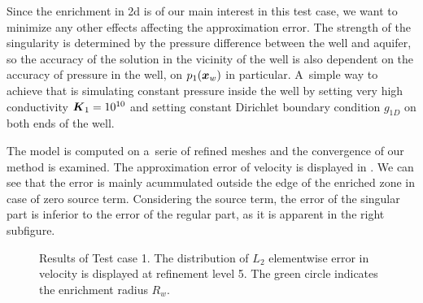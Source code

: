 Since the enrichment in 2d is of our main interest in this test case, we want to minimize any other effects
affecting the approximation error. The strength of the singularity is determined by the pressure difference
between the well and aquifer, so the accuracy of the solution in the vicinity of the well is also dependent
on the accuracy of pressure in the well, on $p_1(\mathbf{\boldsymbol{x}}_w)$ in particular.
A~simple way to achieve that is simulating constant pressure inside the well by setting very high conductivity $\mathbf{\boldsymbol{K}}_1=10^{10}$
and setting constant Dirichlet boundary condition $g_{1D}$ on both ends of the well.

The model is computed on a~serie of refined meshes and the convergence of our method is examined.
The approximation error of velocity is displayed in . We can see that 
the error is mainly acummulated outside the edge of the enriched zone in case of zero source term.
Considering the source term, the error of the singular part is inferior to the error of the regular part, as it is apparent
in the right subfigure.
%
\begin{figure}[!htb]
    \centering
    \caption
    {Results of Test case 1. The distribution of $L_2$ elementwise error in velocity is displayed at refinement level 5.
    The green circle indicates the enrichment radius $R_w$.}
    \label{fig:mh_tc1_error}
\end{figure}
%
%
%
